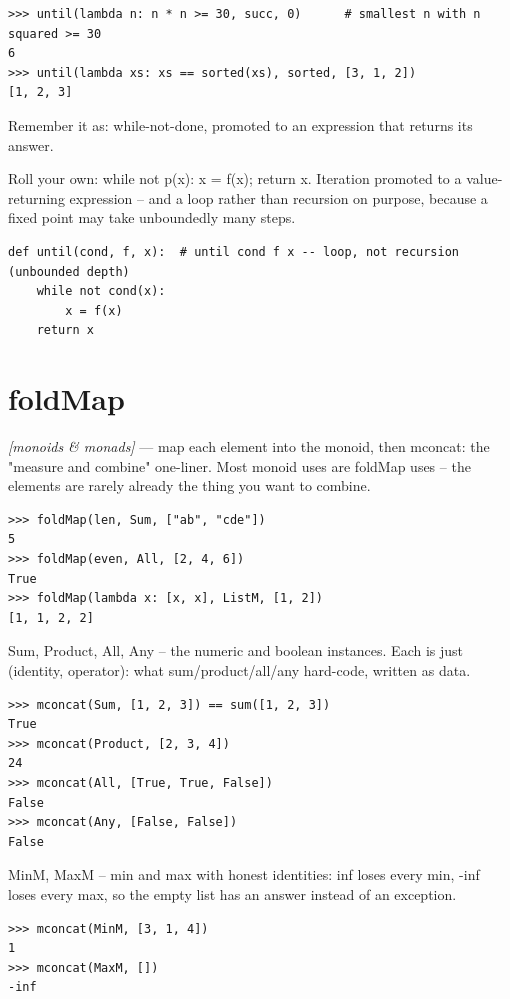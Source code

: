 \documentclass[11pt,letterpaper]{book}
\begin{document}
\begin{lstlisting}[style=spec]
>>> until(lambda n: n * n >= 30, succ, 0)      # smallest n with n squared >= 30
6
>>> until(lambda xs: xs == sorted(xs), sorted, [3, 1, 2])
[1, 2, 3]
\end{lstlisting}

Remember it as: while-not-done, promoted to an expression that returns its answer.


Roll your own: while not p(x): x = f(x); return x. Iteration promoted to a value-returning expression -- and a loop rather than recursion on purpose, because a fixed point may take unboundedly many steps.

\begin{lstlisting}[style=code]
def until(cond, f, x):  # until cond f x -- loop, not recursion (unbounded depth)
    while not cond(x):
        x = f(x)
    return x
\end{lstlisting}

\section{foldMap}
\noindent\textit{[monoids \& monads]} --- map each element into the monoid, then mconcat: the "measure and combine" one-liner. Most monoid uses are foldMap uses -- the elements are rarely already the thing you want to combine.
\begin{lstlisting}[style=spec]
>>> foldMap(len, Sum, ["ab", "cde"])
5
>>> foldMap(even, All, [2, 4, 6])
True
>>> foldMap(lambda x: [x, x], ListM, [1, 2])
[1, 1, 2, 2]
\end{lstlisting}

Sum, Product, All, Any -- the numeric and boolean instances. Each is just (identity, operator): what sum/product/all/any hard-code, written as data.

\begin{lstlisting}[style=spec]
>>> mconcat(Sum, [1, 2, 3]) == sum([1, 2, 3])
True
>>> mconcat(Product, [2, 3, 4])
24
>>> mconcat(All, [True, True, False])
False
>>> mconcat(Any, [False, False])
False
\end{lstlisting}

MinM, MaxM -- min and max with honest identities: inf loses every min, -inf loses every max, so the empty list has an answer instead of an exception.

\begin{lstlisting}[style=spec]
>>> mconcat(MinM, [3, 1, 4])
1
>>> mconcat(MaxM, [])
-inf
\end{lstlisting}
\end{document}
